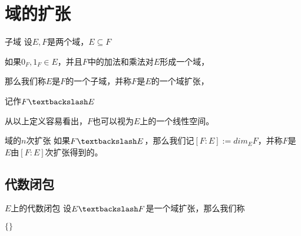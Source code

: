 \documentclass[12pt, a4paper, oneside, UTF8]{ctexbook}
\begin{document}
	\section{域的扩张}
		\begin{defn}{子域}{}
			设$E,F$是两个域，$E \subseteq F$
			
			如果$0_F,1_F \in E$，并且$F$中的加法和乘法对$E$形成一个域，
			
			那么我们称$E$是$F$的一个子域，并称$F$是$E$的一个域扩张，
			
			记作$F\textbackslash E$
		\end{defn}
		从以上定义容易看出，$F$也可以视为$E$上的一个线性空间。
		\begin{defn}{域的$n$次扩张}{}
			如果$F\textbackslash E$，那么我们记$[F:E]:=dim_E F$，并称$F$是$E$由$[F:E]$次扩张得到的。
		\end{defn}
	\subsection{代数闭包}
		\begin{defn}{$E$上的代数闭包}{}
			设$E \textbackslash F$是一个域扩张，那么我们称
			
			$\{\}$
		\end{defn}
\ifx\allfiles\undefined
\end{document}
